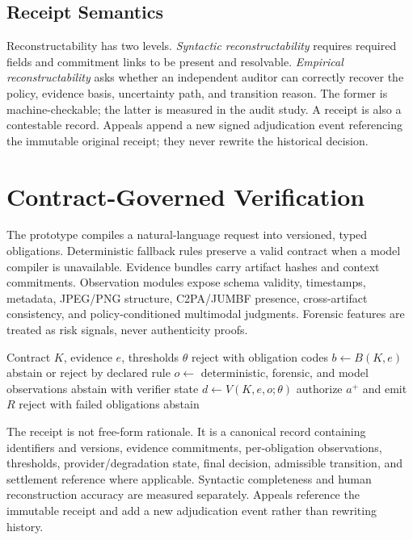 \documentclass[sigconf,anonymous,review]{acmart}
\begin{document}
\subsection{Receipt Semantics}
Reconstructability has two levels. \emph{Syntactic reconstructability} requires required fields and commitment links to be present and resolvable. \emph{Empirical reconstructability} asks whether an independent auditor can correctly recover the policy, evidence basis, uncertainty path, and transition reason. The former is machine-checkable; the latter is measured in the audit study. A receipt is also a contestable record. Appeals append a new signed adjudication event referencing the immutable original receipt; they never rewrite the historical decision.

\section{Contract-Governed Verification}
The prototype compiles a natural-language request into versioned, typed obligations. Deterministic fallback rules preserve a valid contract when a model compiler is unavailable. Evidence bundles carry artifact hashes and context commitments. Observation modules expose schema validity, timestamps, metadata, JPEG/PNG structure, C2PA/JUMBF presence, cross-artifact consistency, and policy-conditioned multimodal judgments. Forensic features are treated as risk signals, never authenticity proofs.

\begin{algorithm}[t]
\caption{Contract-governed selective authorization}
\begin{algorithmic}[1]
\Require Contract $K$, evidence $e$, thresholds $\theta$
  \State \Return reject with obligation codes
\EndIf
\State $b\gets B(K,e)$
 \State \Return abstain or reject by declared rule \EndIf
\State $o\gets$ deterministic, forensic, and model observations
  \State \Return abstain with verifier state
\EndIf
\State $d\gets V(K,e,o;\theta)$
  \State \Return authorize $a^+$ and emit $R$
  \State \Return reject with failed obligations
\Else
  \State \Return abstain
\EndIf
\end{algorithmic}
\end{algorithm}

The receipt is not free-form rationale. It is a canonical record containing identifiers and versions, evidence commitments, per-obligation observations, thresholds, provider/degradation state, final decision, admissible transition, and settlement reference where applicable. Syntactic completeness and human reconstruction accuracy are measured separately. Appeals reference the immutable receipt and add a new adjudication event rather than rewriting history.
\end{document}
